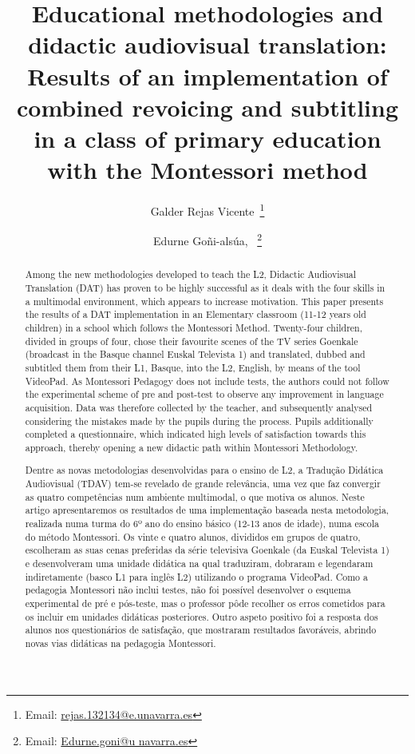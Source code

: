 \documentclass[english]{textolivre}
\title{Educational methodologies and didactic audiovisual translation: Results of an implementation of combined revoicing and subtitling in a class of primary education with the Montessori method}
\author[1]{Galder Rejas Vicente~\orcid{0000-0000-0000-0000}\thanks{Email: \href{rejas.132134@e.unavarra.es}{rejas.132134@e.unavarra.es}}}
\author[1]{Edurne Goñi-alsúa, ~\orcid{0000-0000-0000-0000}\thanks{Email: \href{Edurne.goni@unavarra.es}{Edurne.goni@u navarra.es}}}\affil[1]{Universidad Pública de Navarra, Pamplona, Spain.}
\begin{document}
\maketitle
\begin{polyabstract}
\begin{english}
  \begin{abstract}
    Among the new methodologies developed to teach the L2, Didactic Audiovisual Translation (DAT) has proven to be highly successful as it deals with the four skills in a multimodal environment, which appears to increase motivation. This paper presents the results of a DAT implementation in an Elementary classroom (11-12 years old children) in a school which follows the Montessori Method. Twenty-four children, divided in groups of four, chose their favourite scenes of the TV series Goenkale (broadcast in the Basque channel Euskal Televista 1) and translated, dubbed and subtitled them from their L1, Basque, into the L2, English, by means of the tool VideoPad. As Montessori Pedagogy does not include tests, the authors could not follow the experimental scheme of pre and post-test to observe any improvement in language acquisition. Data was therefore collected by the teacher, and subsequently analysed considering the mistakes made by the pupils during the process.  Pupils additionally completed a questionnaire, which indicated high levels of satisfaction towards this approach, thereby opening a new didactic path within Montessori Methodology. 

  \end{abstract}
\end{english}

\begin{portuguese}
\begin{abstract}
  Dentre as novas metodologias desenvolvidas para o ensino de L2, a Tradução Didática Audiovisual (TDAV) tem-se revelado de grande relevância, uma vez que faz convergir as quatro competências num ambiente multimodal, o que motiva os alunos. Neste artigo apresentaremos os resultados de uma implementação baseada nesta metodologia, realizada numa turma do 6º ano do ensino básico (12-13 anos de idade), numa escola do método Montessori. Os vinte e quatro alunos, divididos em grupos de quatro, escolheram as suas cenas preferidas da série televisiva Goenkale (da Euskal Televista 1) e desenvolveram uma unidade didática na qual traduziram, dobraram e legendaram indiretamente (basco L1 para inglês L2) utilizando o programa VideoPad. Como a pedagogia Montessori não inclui testes, não foi possível desenvolver o esquema experimental de pré e pós-teste, mas o professor pôde recolher os erros cometidos para os incluir em unidades didáticas posteriores. Outro aspeto positivo foi a resposta dos alunos nos questionários de satisfação, que mostraram resultados favoráveis, abrindo novas vias didáticas na pedagogia Montessori.  


\end{abstract}
\end{portuguese}
\end{polyabstract}
\end{document}
